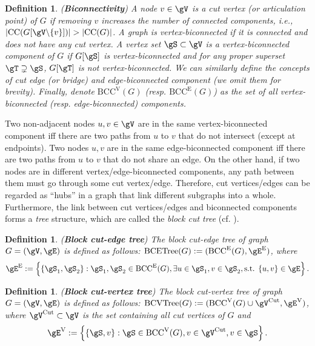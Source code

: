 \documentclass{article}
\let\cref\crtcref
\newtheorem{definition}[theorem]{Definition}
\begin{document}
\begin{definition}
\label{vertex_biconnectivity}
\normalfont (\textbf{Biconnectivity}) A node $v\in\gV$ is a \emph{cut vertex} (or \emph{articulation point}) of $G$ if removing $v$ increases the number of connected components, i.e., $|\mathrm{CC}(G[\gV\backslash\{v\}])|>|\mathrm{CC}(G)|$. A graph is \emph{vertex-biconnected} if it is connected and does not have any cut vertex. A vertex set $\gS\subset\gV$ is a \emph{vertex-biconnected component} of $G$ if $G[\gS]$ is vertex-biconnected and for any proper superset $\gT\supsetneq\gS$, $G[\gT]$ is not vertex-biconnected. We can similarly define the concepts of \emph{cut edge} (or \emph{bridge}) and \emph{edge-biconnected component} (we omit them for brevity). Finally, denote $\mathrm{BCC}^\mathrm{V}(G)$ (resp. $\mathrm{BCC}^\mathrm{E}(G)$) as the set of all vertex-biconnected (resp. edge-biconnected) components.
\end{definition}

\vspace{-4pt}

Two non-adjacent nodes $u,v\in\gV$ are in the same vertex-biconnected component iff there are two paths from $u$ to $v$ that do not intersect (except at endpoints). Two nodes $u,v$ are in the same edge-biconnected component iff there are two paths from $u$ to $v$ that do not share an edge. On the other hand, if two nodes are in different vertex/edge-biconnected components, any path between them must go through some cut vertex/edge. Therefore, cut vertices/edges can be regarded as ``hubs'' in a graph that link different subgraphs into a whole. Furthermore, the link between cut vertices/edges and biconnected components forms a \emph{tree} structure, which are called the \emph{block cut tree} (cf. \cref{fig:block_cut_tree}).

\begin{definition}
\label{def:bcetree}
\normalfont (\textbf{Block cut-edge tree}) The block cut-edge tree of graph $G=(\gV,\gE)$ is defined as follows: $\operatorname{BCETree}(G):=(\mathrm{BCC}^\mathrm{E}(G),\gE^\mathrm{E})$, where
\begin{equation*}
\setlength{\abovedisplayskip}{2pt}
\setlength{\belowdisplayskip}{0pt}
    \gE^\mathrm{E}:=\left\{\{\gS_1,\gS_2\}:\gS_1,\gS_2\in\mathrm{BCC}^\mathrm{E}(G),\exists u\in\gS_1,v\in\gS_2,\text{s.t. }\{u,v\}\in\gE\right\}.
\end{equation*}
\end{definition}
\begin{definition}
\label{def:bcvtree}
\normalfont (\textbf{Block cut-vertex tree}) The block cut-vertex tree of graph $G=(\gV,\gE)$ is defined as follows: $\operatorname{BCVTree}(G):=(\mathrm{BCC}^\mathrm{V}(G)\cup\gV^\mathrm{Cut},\gE^\mathrm{V})$, where $\gV^\mathrm{Cut}\subset\gV$ is the set containing all cut vertices of $G$ and
\begin{equation*}
\setlength{\abovedisplayskip}{0pt}
\setlength{\belowdisplayskip}{0pt}
    \gE^\mathrm{V}:=\left\{\{\gS,v\}:\gS\in\mathrm{BCC}^\mathrm{V}(G),v\in\gV^\mathrm{Cut},v\in\gS\right\}.
\end{equation*}
\end{definition}
\vspace{-5pt}
\end{document}
